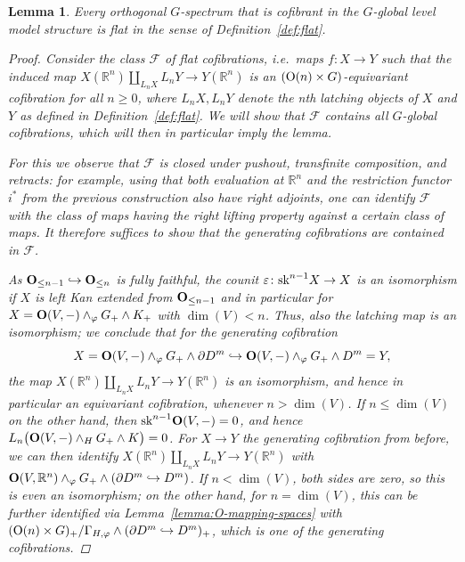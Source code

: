 \documentclass[reqno]{memo-l}
\theoremstyle{mythm}
\newtheorem{lemma}[thm]{Lemma}
\theoremstyle{definition}
\numberwithin{equation}{section}
\newcommand{\R} {{\mathbb{R}}}
\renewcommand{\phi}{\varphi}
\renewcommand{\epsilon}{\varepsilon}
\newcommand{\sk}{{\textup{sk}}}
\newcommand{\cat}[1]{\textbf{\textup{#1}}}
\renewcommand{\O}{{\textup{O}}}
\let\smashp=\wedge
\begin{document}
\begin{lemma}\label{lemma:cofibrant-G-gl-are-flat}
    Every orthogonal $G$-spectrum that is cofibrant in the $G$-global level model structure is flat in the sense of Definition~\ref{def:flat}.
    \begin{proof}
        Consider the class $\mathscr F$ of \emph{flat cofibrations}, i.e.\ maps $f\colon X\to Y$ such that the induced map $X(\R^n)\amalg_{L_nX}L_nY\to Y(\R^n)$ is an $(\O(n)\times G)$-equivariant cofibration for all $n\ge0$, where $L_nX, L_nY$ denote the nth latching objects of $X$ and $Y$ as defined in Definition~\ref{def:flat}. We will show that $\mathscr F$ contains all $G$-global cofibrations, which will then in particular imply the lemma.        
        
        For this we observe that $\mathscr F$ is closed under pushout, transfinite composition, and retracts: for example, using that both evaluation at $\R^n$ and the restriction functor $i^*$ from the previous construction also have \emph{right} adjoints, one can identify $\mathscr F$ with the class of maps having the right lifting property against a certain class of maps. It therefore suffices to show that the generating cofibrations are contained in $\mathscr F$.

        As $\cat{O}_{\le n-1}\hookrightarrow\cat{O}_{\le n}$ is fully faithful, the counit $\epsilon\colon\sk^{n-1}X\to X$ is an isomorphism if $X$ is left Kan extended from $\cat{O}_{\le n-1}$ and in particular for $X=\cat{O}(V,-)\smashp_\phi G_+\smashp K_+$ with $\dim(V)<n$. Thus, also the latching map is an isomorphism; we conclude that for the generating cofibration \[X=\cat{O}(V,-)\smashp_\phi G_+\smashp\partial D^m\hookrightarrow \cat{O}(V,-)\smashp_\phi G_+\smashp D^m=Y,\] the map $X(\R^n)\amalg_{L_nX} L_nY\to Y(\R^n)$ is an isomorphism, and hence in particular an equivariant cofibration, whenever $n>\dim(V)$. If $n\le\dim(V)$ on the other hand, then $\sk^{n-1}\cat{O}(V,-)=0$, and hence $L_n\big(\cat{O}(V,-)\smashp_HG_+\smashp K\big)=0$. For $X\to Y$ the generating cofibration from before, we can then identify $X(\R^n)\amalg_{L_nX}L_nY\to Y(\R^n)$ with $\cat{O}(V,\R^n)\smashp_\phi G_+\smashp(\partial D^m\hookrightarrow D^m)$. If $n<\dim(V)$, both sides are zero, so this is even an isomorphism; on the other hand, for $n=\dim(V)$, this can be further identified via Lemma~\ref{lemma:O-mapping-spaces} with $(\O(n)\times G)_+/\Gamma_{H,\phi}\smashp(\partial D^m\hookrightarrow D^m)_+$, which is one of the generating cofibrations.
    \end{proof}
\end{lemma}
\end{document}
